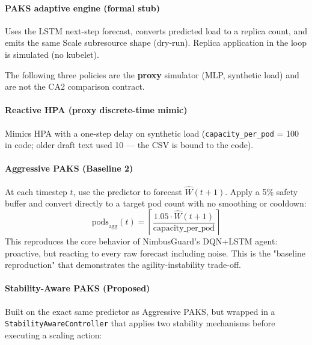 \paragraph{PAKS adaptive engine (formal stub)} Uses the LSTM next-step forecast, converts predicted load to a replica count, and emits the same Scale subresource shape (dry-run). Replica application in the loop is simulated (no kubelet).

The following three policies are the \textbf{proxy} simulator (MLP, synthetic load) and are not the CA2 comparison contract.

\paragraph{Reactive HPA (proxy discrete-time mimic)} Mimics HPA with a one-step delay on synthetic load (\texttt{capacity\_per\_pod} = 100 in code; older draft text used 10 --- the CSV is bound to the code).

\paragraph{Aggressive PAKS (Baseline 2)} At each timestep $t$, use the predictor to forecast $\hat{W}(t+1)$. Apply a 5\% safety buffer and convert directly to a target pod count with no smoothing or cooldown:
\[
\text{pods}_{\text{agg}}(t) = \left\lceil \frac{1.05 \cdot \hat{W}(t+1)}{\text{capacity\_per\_pod}} \right\rceil
\]
This reproduces the core behavior of NimbusGuard's DQN+LSTM agent: proactive, but reacting to every raw forecast including noise. This is the "baseline reproduction" that demonstrates the agility-instability trade-off.

\paragraph{Stability-Aware PAKS (Proposed)} Built on the exact same predictor as Aggressive PAKS, but wrapped in a \texttt{StabilityAwareController} that applies two stability mechanisms before executing a scaling action:

